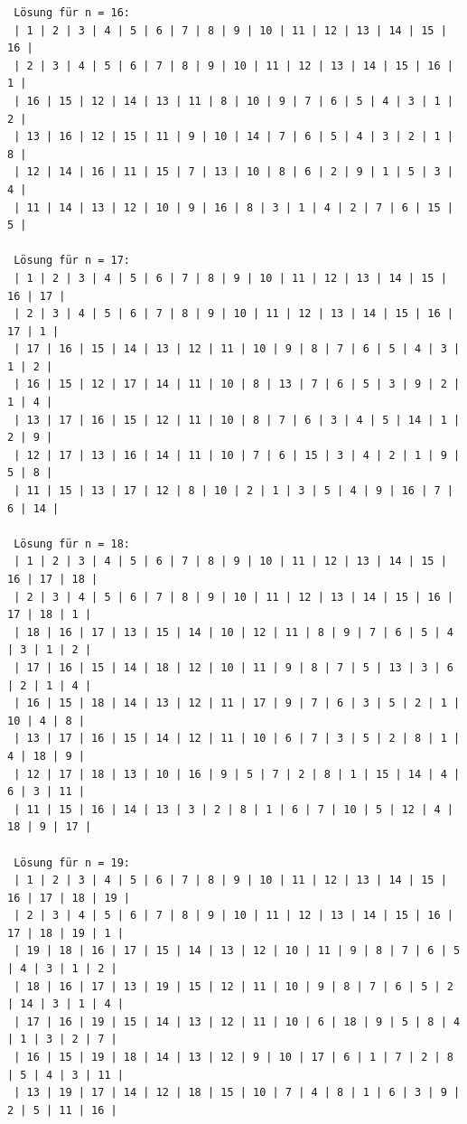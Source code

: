 \documentclass[a4paper, notitlepage, 12pt]{scrartcl}
\begin{document}
\begin{center}
\begin{Verbatim}
 Lösung für n = 16: 
 | 1 | 2 | 3 | 4 | 5 | 6 | 7 | 8 | 9 | 10 | 11 | 12 | 13 | 14 | 15 | 16 | 
 | 2 | 3 | 4 | 5 | 6 | 7 | 8 | 9 | 10 | 11 | 12 | 13 | 14 | 15 | 16 | 1 | 
 | 16 | 15 | 12 | 14 | 13 | 11 | 8 | 10 | 9 | 7 | 6 | 5 | 4 | 3 | 1 | 2 | 
 | 13 | 16 | 12 | 15 | 11 | 9 | 10 | 14 | 7 | 6 | 5 | 4 | 3 | 2 | 1 | 8 | 
 | 12 | 14 | 16 | 11 | 15 | 7 | 13 | 10 | 8 | 6 | 2 | 9 | 1 | 5 | 3 | 4 | 
 | 11 | 14 | 13 | 12 | 10 | 9 | 16 | 8 | 3 | 1 | 4 | 2 | 7 | 6 | 15 | 5 | 
 
 Lösung für n = 17: 
 | 1 | 2 | 3 | 4 | 5 | 6 | 7 | 8 | 9 | 10 | 11 | 12 | 13 | 14 | 15 | 16 | 17 | 
 | 2 | 3 | 4 | 5 | 6 | 7 | 8 | 9 | 10 | 11 | 12 | 13 | 14 | 15 | 16 | 17 | 1 | 
 | 17 | 16 | 15 | 14 | 13 | 12 | 11 | 10 | 9 | 8 | 7 | 6 | 5 | 4 | 3 | 1 | 2 | 
 | 16 | 15 | 12 | 17 | 14 | 11 | 10 | 8 | 13 | 7 | 6 | 5 | 3 | 9 | 2 | 1 | 4 | 
 | 13 | 17 | 16 | 15 | 12 | 11 | 10 | 8 | 7 | 6 | 3 | 4 | 5 | 14 | 1 | 2 | 9 | 
 | 12 | 17 | 13 | 16 | 14 | 11 | 10 | 7 | 6 | 15 | 3 | 4 | 2 | 1 | 9 | 5 | 8 | 
 | 11 | 15 | 13 | 17 | 12 | 8 | 10 | 2 | 1 | 3 | 5 | 4 | 9 | 16 | 7 | 6 | 14 | 
 
 Lösung für n = 18:
 | 1 | 2 | 3 | 4 | 5 | 6 | 7 | 8 | 9 | 10 | 11 | 12 | 13 | 14 | 15 | 16 | 17 | 18 | 
 | 2 | 3 | 4 | 5 | 6 | 7 | 8 | 9 | 10 | 11 | 12 | 13 | 14 | 15 | 16 | 17 | 18 | 1 | 
 | 18 | 16 | 17 | 13 | 15 | 14 | 10 | 12 | 11 | 8 | 9 | 7 | 6 | 5 | 4 | 3 | 1 | 2 | 
 | 17 | 16 | 15 | 14 | 18 | 12 | 10 | 11 | 9 | 8 | 7 | 5 | 13 | 3 | 6 | 2 | 1 | 4 | 
 | 16 | 15 | 18 | 14 | 13 | 12 | 11 | 17 | 9 | 7 | 6 | 3 | 5 | 2 | 1 | 10 | 4 | 8 | 
 | 13 | 17 | 16 | 15 | 14 | 12 | 11 | 10 | 6 | 7 | 3 | 5 | 2 | 8 | 1 | 4 | 18 | 9 | 
 | 12 | 17 | 18 | 13 | 10 | 16 | 9 | 5 | 7 | 2 | 8 | 1 | 15 | 14 | 4 | 6 | 3 | 11 | 
 | 11 | 15 | 16 | 14 | 13 | 3 | 2 | 8 | 1 | 6 | 7 | 10 | 5 | 12 | 4 | 18 | 9 | 17 | 
 
 Lösung für n = 19: 
 | 1 | 2 | 3 | 4 | 5 | 6 | 7 | 8 | 9 | 10 | 11 | 12 | 13 | 14 | 15 | 16 | 17 | 18 | 19 | 
 | 2 | 3 | 4 | 5 | 6 | 7 | 8 | 9 | 10 | 11 | 12 | 13 | 14 | 15 | 16 | 17 | 18 | 19 | 1 | 
 | 19 | 18 | 16 | 17 | 15 | 14 | 13 | 12 | 10 | 11 | 9 | 8 | 7 | 6 | 5 | 4 | 3 | 1 | 2 | 
 | 18 | 16 | 17 | 13 | 19 | 15 | 12 | 11 | 10 | 9 | 8 | 7 | 6 | 5 | 2 | 14 | 3 | 1 | 4 | 
 | 17 | 16 | 19 | 15 | 14 | 13 | 12 | 11 | 10 | 6 | 18 | 9 | 5 | 8 | 4 | 1 | 3 | 2 | 7 | 
 | 16 | 15 | 19 | 18 | 14 | 13 | 12 | 9 | 10 | 17 | 6 | 1 | 7 | 2 | 8 | 5 | 4 | 3 | 11 | 
 | 13 | 19 | 17 | 14 | 12 | 18 | 15 | 10 | 7 | 4 | 8 | 1 | 6 | 3 | 9 | 2 | 5 | 11 | 16 | 
 

\end{Verbatim}
\end{center}
\end{document}
